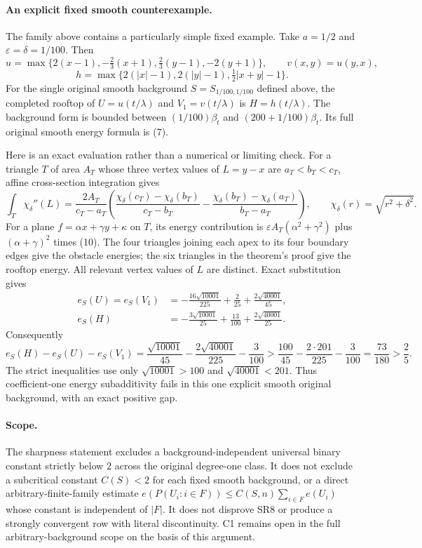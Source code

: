\documentclass{article}
\begin{document}
\paragraph{An explicit fixed smooth counterexample.}
The family above contains a particularly simple fixed example. Take
$a=1/2$ and $\varepsilon=\delta=1/100$. Then
\[
 u=\max\{2(x-1),-\tfrac23(x+1),\tfrac23(y-1),-2(y+1)\},
 \qquad v(x,y)=u(y,x),
\]
\[
 h=\max\{2(|x|-1),2(|y|-1),\tfrac12|x+y|-1\}.
\]
For the single original smooth background $S=S_{1/100,1/100}$ defined
above, the completed rooftop
of $U=u(t/\lambda)$ and $V_1=v(t/\lambda)$ is $H=h(t/\lambda)$.
The background form is bounded between $(1/100)\beta_t$ and
$(200+1/100)\beta_t$. Its full original smooth energy formula is (7).

Here is an exact evaluation rather than a numerical or limiting check.
For a triangle $T$ of area $A_T$ whose three vertex values of $L=y-x$
are $a_T<b_T<c_T$, affine cross-section integration gives
\[
 \int_T\chi_\delta''(L)
 =\frac{2A_T}{c_T-a_T}
  \left(\frac{\chi_\delta(c_T)-\chi_\delta(b_T)}{c_T-b_T}
       -\frac{\chi_\delta(b_T)-\chi_\delta(a_T)}{b_T-a_T}\right),
 \qquad \chi_\delta(r)=\sqrt{r^2+\delta^2}.                 \tag{10}
\]
For a plane $f=\alpha x+\gamma y+\kappa$ on $T$, its energy contribution
is $\varepsilon A_T(\alpha^2+\gamma^2)$ plus $(\alpha+\gamma)^2$
times (10). The four triangles joining each apex to its four boundary
edges give the obstacle energies; the six triangles in the theorem's
proof give the rooftop energy. All relevant vertex values of $L$ are
distinct. Exact substitution gives
\begin{align*}
 e_S(U)=e_S(V_1)
     &=-\frac{16\sqrt{10001}}{225}+\frac2{25}
                                  +\frac{2\sqrt{40001}}{45},\\
 e_S(H)&=-\frac{3\sqrt{10001}}{25}+\frac{13}{100}
                                  +\frac{2\sqrt{40001}}{25}.
\end{align*}
Consequently
\[
 e_S(H)-e_S(U)-e_S(V_1)
     =\frac{\sqrt{10001}}{45}
         -\frac{2\sqrt{40001}}{225}-\frac3{100}
     >\frac{100}{45}-\frac{2\cdot201}{225}-\frac3{100}
      =\frac{73}{180}>\frac25.                            \tag{11}
\]
The strict inequalities use only $\sqrt{10001}>100$ and
$\sqrt{40001}<201$. Thus coefficient-one energy subadditivity fails in
this one explicit smooth original background, with an exact positive gap.

\paragraph{Scope.}
The sharpness statement excludes a background-independent universal binary
constant strictly below $2$ across the original degree-one class. It does
not exclude a subcritical constant $C(S)<2$ for each fixed smooth
background, or a direct arbitrary-finite-family estimate
$e(P(U_i:i\in F))\le C(S,n)\sum_{i\in F}e(U_i)$ whose constant is
independent of $|F|$. It does not disprove SR8 or produce a strongly
convergent row with literal discontinuity. C1 remains open in the full
arbitrary-background scope on the basis of this argument.
\end{document}
